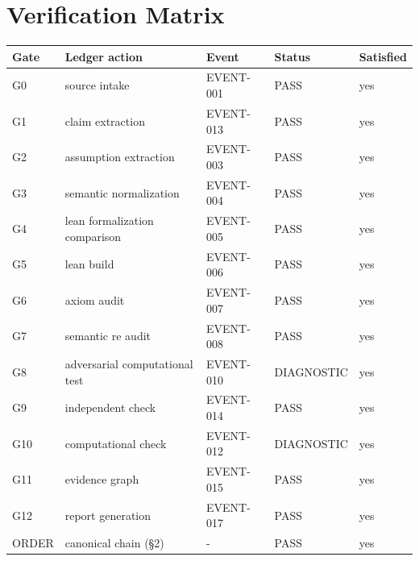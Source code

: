 \documentclass[11pt]{article}
\begin{document}
\section{Verification Matrix}
\begin{longtable}{lllll}
\toprule Gate & Ledger action & Event & Status & Satisfied \\ \midrule \endhead
G0 & source intake & EVENT-001 & PASS & yes \\
G1 & claim extraction & EVENT-013 & PASS & yes \\
G2 & assumption extraction & EVENT-003 & PASS & yes \\
G3 & semantic normalization & EVENT-004 & PASS & yes \\
G4 & lean formalization comparison & EVENT-005 & PASS & yes \\
G5 & lean build & EVENT-006 & PASS & yes \\
G6 & axiom audit & EVENT-007 & PASS & yes \\
G7 & semantic re audit & EVENT-008 & PASS & yes \\
G8 & adversarial computational test & EVENT-010 & DIAGNOSTIC & yes \\
G9 & independent check & EVENT-014 & PASS & yes \\
G10 & computational check & EVENT-012 & DIAGNOSTIC & yes \\
G11 & evidence graph & EVENT-015 & PASS & yes \\
G12 & report generation & EVENT-017 & PASS & yes \\
ORDER & canonical chain (\S{}2) & - & PASS & yes \\
\bottomrule
\end{longtable}
\end{document}
